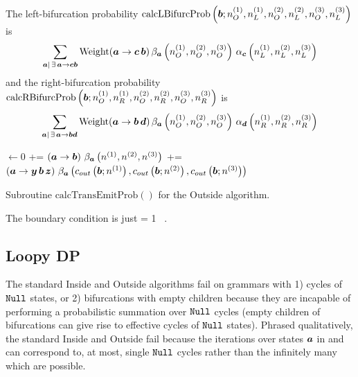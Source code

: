 \documentclass[10pt]{article}
\begin{document}
The left-bifurcation probability $\mathrm{calcLBifurcProb}\left( \boldsymbol{b}; n^{(1)}_O,n^{(1)}_L,n^{(2)}_O,n^{(2)}_L,n^{(3)}_O,n^{(3)}_L \right)$ is
\[ \sum_{\boldsymbol{a}|\,\exists\, \boldsymbol{a}\to\boldsymbol{c}\boldsymbol{b}} \operatorname{Weight} (\boldsymbol{a}\to\boldsymbol{c}\,\boldsymbol{b}) \, \beta_{\boldsymbol{a}}\left( n^{(1)}_O,n^{(2)}_O,n^{(3)}_O\right) \, \alpha_{\boldsymbol{c}}\left( n^{(1)}_L,n^{(2)}_L,n^{(3)}_L\right) \]
and the right-bifurcation probability $\mathrm{calcRBifurcProb}\left( \boldsymbol{b}; n^{(1)}_O,n^{(1)}_R,n^{(2)}_O,n^{(2)}_R,n^{(3)}_O,n^{(3)}_R \right)$ is
\[ \sum_{\boldsymbol{a}|\,\exists\, \boldsymbol{a}\to\boldsymbol{b}\boldsymbol{d}} \operatorname{Weight} (\boldsymbol{a}\to\boldsymbol{b}\,\boldsymbol{d}) \, \beta_{\boldsymbol{a}}\left( n^{(1)}_O,n^{(2)}_O,n^{(3)}_O\right) \, \alpha_{\boldsymbol{d}}\left( n^{(1)}_R,n^{(2)}_R,n^{(3)}_R\right) \]


\begin{algorithm}[!ht]
  \SetLine

  \emitProb $\leftarrow 0$\;
   {
    \emitProb += \Weight$\left( \boldsymbol{a} \to \boldsymbol{b} \right)\, \beta_{\boldsymbol{a}}\left( n^{(1)}, n^{(2)}, n^{(3)} \right)$\;
  }
   {
    \emitProb += \Weight$\left( \boldsymbol{a} \to \boldsymbol{y}\,\boldsymbol{b}\,\boldsymbol{z} \right)\, \beta_{\boldsymbol{a}}\left( c_{out}\left(\boldsymbol{b}; n^{(1)}\right), c_{out}\left(\boldsymbol{b}; n^{(2)}\right), c_{out}\left(\boldsymbol{b}; n^{(3)}\right) \right)$\;
  }
  \KwRet{\emitProb}\;
  \caption{
    Subroutine $\mathrm{calcTransEmitProb}()$ for the Outside algorithm.
  }
\end{algorithm}

The boundary condition is just
\beqn
{} = 1 \, .
\eeqn



\subsection{Loopy DP}

The standard Inside and Outside algorithms fail on grammars with 1) cycles of $\mathtt{Null}$ states, 
or 2) bifurcations with empty children
because they are incapable of performing a probabilistic summation over $\mathtt{Null}$ cycles
(empty children of bifurcations can give rise to effective cycles of $\mathtt{Null}$ states).
Phrased qualitatively, the standard Inside and Outside fail because the iterations over
states $\boldsymbol{a}$ in  and 
can correspond to, at most, single $\mathtt{Null}$ cycles rather than the infinitely many which are possible.
\end{document}
